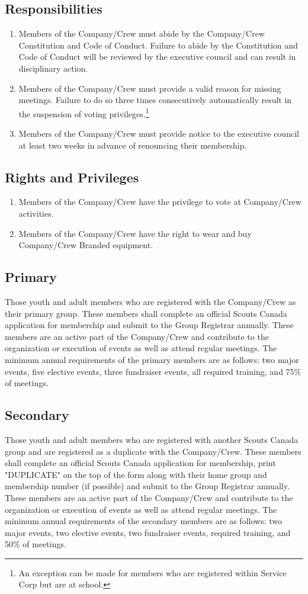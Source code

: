 \documentclass{Service_Corps_Document}
\begin{document}
\subsection{Responsibilities}
\begin{enumerate}
	\item Members of the Company/Crew must abide by the Company/Crew Constitution and Code of Conduct. Failure to abide by the Constitution and Code of Conduct will be reviewed by the executive council and can result in disciplinary action. 
	\item Members of the Company/Crew must provide a valid reason for missing meetings. Failure to do so three times consecutively automatically result in the suspension of voting privileges.\footnote{An exception can be made for members who are registered within Service Corp but are at school.}
	\item Members of the Company/Crew must provide notice to the executive council at least two weeks in advance of renouncing their membership.
\end{enumerate}
\subsection{Rights and Privileges}
\begin{enumerate}
	\item Members of the Company/Crew have the privilege to vote at Company/Crew activities.
	\item Members of the Company/Crew have the right to wear and buy Company/Crew Branded equipment.
\end{enumerate}
\subsection{Primary}
Those youth and adult members who are registered with the Company/Crew as their primary group. These members shall complete an official Scouts Canada application for membership and submit to the Group Registrar annually. These members are an active part of the Company/Crew and contribute to the organization or execution of events as well as attend regular meetings. The minimum annual requirements of the primary members are as follows: two major events, five elective events, three fundraiser events, all required training, and 75\% of meetings.
\subsection{Secondary}
Those youth and adult members who are registered with another Scouts Canada group and are registered as a duplicate with the Company/Crew. These members shall complete an official Scouts Canada application for membership, print "DUPLICATE" on the top of the form along with their home group and membership number (if possible) and submit to the Group Registrar annually. These members are an active part of the Company/Crew and contribute to the organization or execution of events as well as attend regular meetings. The minimum annual requirements of the secondary members are as follows: two major events, two elective events, two fundraiser events, required training, and 50\% of meetings. 
\end{document}
